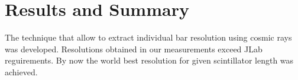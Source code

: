 \section{Results and Summary}
\label{Summary}

The technique that allow to extract individual bar resolution using cosmic rays was developed. Resolutions obtained in our measurements exceed JLab reguirements. By now the world best resolution for given scintillator length was achieved.
